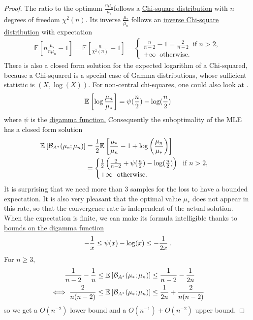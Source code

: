 \documentclass{article}
\newcommand*{\expect}[2][]{\ensuremath{\mathbb{E}_{#1} \left[ #2 \right] }} %
\newcommand{\logpart}{A}
\newcommand{\bregmanconj}{\cB_{\logpart^*}}
\begin{document}
	\begin{proof}
	The ratio to the optimum  $\frac{n \mu_n}{\mu_*}$follows a \href{https://en.wikipedia.org/wiki/Chi-square_distribution}{Chi-square distribution} with $n$ degrees of freedom $\chi^2(n)$. Its inverse $\frac{\mu_*}{ \mu_n} $ follows an \href{https://en.wikipedia.org/wiki/Inverse-chi-squared_distribution}{inverse Chi-square distribution} with expectation 
	\begin{align}
		\expect{n \frac{\mu_*}{n \mu_n}  - 1} 
		= \expect{\frac{n}{\chi^2(n)} - 1} =
		\begin{cases}
			\frac{n}{n-2} -1 = \frac{2}{n-2} \ \text{ if } n>2, \\
			+\infty \  \text{ otherwise. }
		\end{cases}
	\end{align}
	There is also a closed form solution for the expected logarithm of a Chi-squared, because a Chi-squared is a special case of Gamma distributions, whose sufficient statistic is $(X,\log(X))$. For non-central chi-squares, one could also look at \citep{pav2015moments}.
	\begin{align}
		\expect{\log \frac{\mu_n}{\mu_*}} = \psi(\half[n]) - \log(\half[n])
	\end{align}
	where $\psi$ is the \href{https://en.wikipedia.org/wiki/Digamma_function}{digamma function.}
	Consequently the suboptimality of the MLE has a closed form solution
	\begin{align}
	\expect{\bregmanconj( \mu_*; \mu_n) }
	&= \half \expect{\frac{\mu_*}{ \mu_n} - 1 + \log \left(\frac{\mu_n}{\mu_*} \right) } \\
	& =
	\begin{cases}
		\half \left ( \frac{2}{n-2} +\psi(\half[n]) - \log(\half[n]) \right )  \ \text{ if } n>2, \\
			+\infty \  \text{ otherwise. }
	\end{cases}
	\end{align}
	It is surprising that we need more than $3$ samples for the loss to have a bounded expectation. 
	It is also very pleasant that the optimal value $\mu_*$ does not appear in this rate, so that the convergence rate is independent of the actual solution.
	When the expectation is finite, we can make its formula intelligible thanks to \href{https://en.wikipedia.org/wiki/Digamma_function#Inequalities}{bounds on the digamma function}
	\begin{align}
		-\frac{1}{x} \leq \psi(x) - \log(x) \leq -\frac{1}{2x}	\; .
	\end{align}
	  For $n\geq 3$,
	\begin{align}
		\inv{n-2} - \inv{n}
		&\leq \expect{\bregmanconj( \mu_*; \mu_n) }
		\leq \inv{n-2} - \inv{2 n} \\
		\iff
			\frac{2}{n(n-2)}
			&\leq \expect{\bregmanconj( \mu_*; \mu_n) }
			\leq \inv{2n} +\frac{2}{n(n-2)}
	\end{align}
	so we get a $O(n^{-2})$ lower bound and a $O(n^{-1}) + O(n^{-2})$ upper bound.
	\end{proof}
\end{document}
